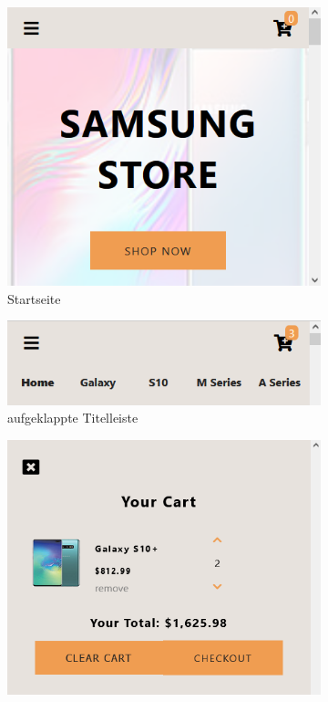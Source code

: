 \begin{figure}
    \centering
    \begin{subfigure}[b]{0.32\textwidth}
        \centering
        \includegraphics[width=\textwidth]{pictures/Start.png}
        \caption{Startseite}
        \label{fig:online-shopping-website-start}
    \end{subfigure}
    \hfill
    \begin{subfigure}[b]{0.32\textwidth}
        \centering
        \includegraphics[width=\textwidth]{pictures/Leiste.png}
        \caption{auf\-ge\-klappte Titelleiste}
        \label{fig:online-shopping-website-menu}
    \end{subfigure}
    \hfill
    \begin{subfigure}[b]{0.32\textwidth}
        \centering
        \includegraphics[width=\textwidth]{pictures/Cart.png}

\end{subfigure}
\end{figure}
